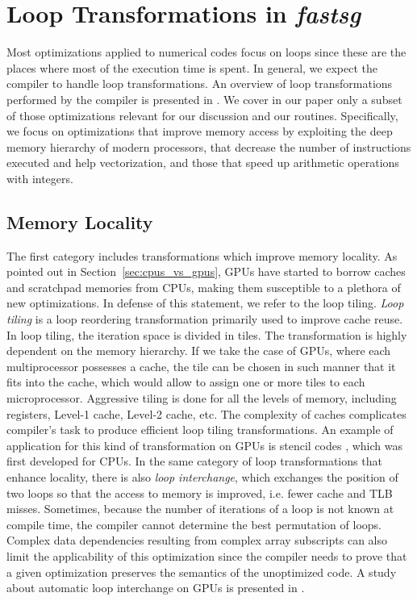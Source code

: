 \section{Loop Transformations in \textit{fastsg}}
\label{sec:optimizations}

Most optimizations applied to numerical codes focus on loops since these are the
places where most of the execution time is spent. In general, we expect the
compiler to handle loop transformations. An overview of loop transformations
performed by the compiler is presented in \cite{Bacon:1994:CTH:197405.197406}.
We cover in our paper only a subset of those optimizations relevant for our
discussion and our routines. Specifically, we focus on optimizations that
improve memory access by exploiting the deep memory hierarchy of modern
processors, that decrease the number of instructions executed and help
vectorization, and those that speed up arithmetic operations with integers.

\subsection{Memory Locality}

The first category includes transformations which improve memory locality. As
pointed out in Section~\ref{sec:cpus_vs_gpus}, GPUs have started to borrow
caches and scratchpad memories from CPUs, making them susceptible to a plethora
of new optimizations. In defense of this statement, we refer to the loop tiling.
\textit{Loop tiling} is a loop reordering transformation primarily used to
improve cache reuse. In loop tiling, the iteration space is divided in tiles.
The transformation is highly dependent on the memory hierarchy. If we take the
case of GPUs, where each multiprocessor possesses a cache, the tile can be
chosen in such manner that it fits into the cache, which would allow to assign
one or more tiles to each microprocessor. Aggressive tiling is done for all the
levels of memory, including registers, Level-1 cache, Level-2 cache, etc. The
complexity of caches complicates compiler's task to produce efficient loop
tiling transformations. An example of application for this kind of
transformation on GPUs is stencil codes \cite{volkov2010}, which was first
developed for CPUs. In the same category of loop transformations that enhance
locality, there is also \textit{loop interchange}, which exchanges the position
of two loops so that the access to memory is improved, i.e. fewer cache and TLB
misses. Sometimes, because the number of iterations of a loop is not known at
compile time, the compiler cannot determine the best permutation of loops.
Complex data dependencies resulting from complex array subscripts can also limit
the applicability of this optimization since the compiler needs to prove that a
given optimization preserves the semantics of the unoptimized code. A study
about automatic loop interchange on GPUs is presented in
\cite{Leung:2009:APG:1596655.1596670}.

